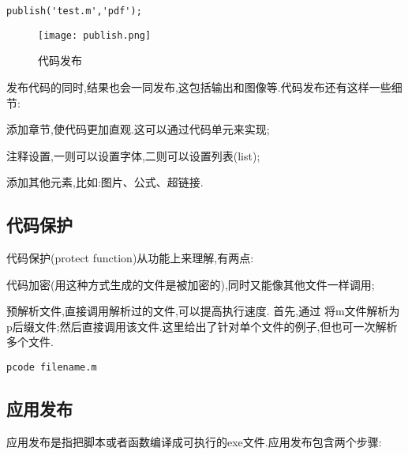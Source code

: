   \vspace{-0.8cm}
  \begin{lstlisting}[caption = 代码发布]
    publish('test.m','pdf');
  \end{lstlisting}

\myenddot

\begin{figure}[htbp]
  \centering
  \texttt{[image: publish.png]}
  \caption{代码发布}
\end{figure}

发布代码的同时,结果也会一同发布,这包括输出和图像等.代码发布还有这样一些细节:
\begindot
  \item 添加章节,使代码更加直观.这可以通过代码单元来实现;
  \item 注释设置,一则可以设置字体,二则可以设置列表(list);
  \item 添加其他元素,比如:图片、公式、超链接.
\myenddot




\subsection{代码保护}
代码保护(protect function)从功能上来理解,有两点:
\begindot
  \item 代码加密(用这种方式生成的文件是被加密的),同时又能像其他文件一样调用;
  \item 预解析文件,直接调用解析过的文件,可以提高执行速度.
\myenddot
首先,通过  将m文件解析为p后缀文件;然后直接调用该文件.这里给出了针对单个文件的例子,但也可一次解析多个文件.

  \vspace{-0.8cm}
  \begin{lstlisting}[caption = 代码保护]
    pcode filename.m
  \end{lstlisting}




\subsection{应用发布}
 应用发布是指把脚本或者函数编译成可执行的exe文件.应用发布包含两个步骤:

